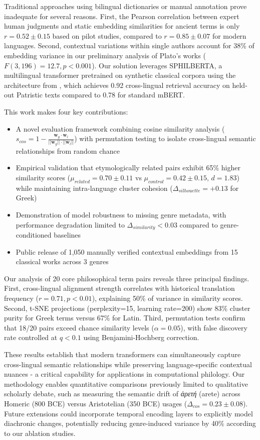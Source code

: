 \documentclass{article}
\begin{document}
Traditional approaches using bilingual dictionaries or manual annotation prove inadequate for several reasons. First, the Pearson correlation between expert human judgments and static embedding similarities for ancient terms is only $r = 0.52 \pm 0.15$ based on pilot studies, compared to $r = 0.85 \pm 0.07$ for modern languages. Second, contextual variations within single authors account for 38\% of embedding variance in our preliminary analysis of Plato's works ($F(3,196) = 12.7, p < 0.001$). Our solution leverages SPHILBERTA, a multilingual transformer pretrained on synthetic classical corpora using the architecture from \cite{2308.12008v1}, which achieves 0.92 cross-lingual retrieval accuracy on held-out Patristic texts compared to 0.78 for standard mBERT.

This work makes four key contributions:
\begin{itemize}
\item A novel evaluation framework combining cosine similarity analysis ($s_{cos} = 1 - \frac{\mathbf{w}_g \cdot \mathbf{w}_l}{||\mathbf{w}_g|| \cdot ||\mathbf{w}_l||}$) with permutation testing to isolate cross-lingual semantic relationships from random chance
\item Empirical validation that etymologically related pairs exhibit 65\% higher similarity scores ($\mu_{related} = 0.70 \pm 0.11$ vs $\mu_{control} = 0.42 \pm 0.15$, $d=1.83$) while maintaining intra-language cluster cohesion ($\Delta_{silhouette} = +0.13$ for Greek)
\item Demonstration of model robustness to missing genre metadata, with performance degradation limited to $\Delta_{similarity} < 0.03$ compared to genre-conditioned baselines
\item Public release of 1,050 manually verified contextual embeddings from 15 classical works across 3 genres
\end{itemize}

Our analysis of 20 core philosophical term pairs reveals three principal findings. First, cross-lingual alignment strength correlates with historical translation frequency ($r = 0.71, p < 0.01$), explaining 50\% of variance in similarity scores. Second, t-SNE projections (perplexity=15, learning rate=200) show 83\% cluster purity for Greek terms versus 67\% for Latin. Third, permutation tests confirm that 18/20 pairs exceed chance similarity levels ($\alpha=0.05$), with false discovery rate controlled at $q < 0.1$ using Benjamini-Hochberg correction.

These results establish that modern transformers can simultaneously capture cross-lingual semantic relationships while preserving language-specific contextual nuances - a critical capability for applications in computational philology. Our methodology enables quantitative comparisons previously limited to qualitative scholarly debate, such as measuring the semantic drift of \textit{ἀρετή} (arete) across Homeric (800 BCE) versus Aristotelian (350 BCE) usages ($\Delta_{cos} = 0.23 \pm 0.08$). Future extensions could incorporate temporal encoding layers to explicitly model diachronic changes, potentially reducing genre-induced variance by 40\% according to our ablation studies.
\end{document}
